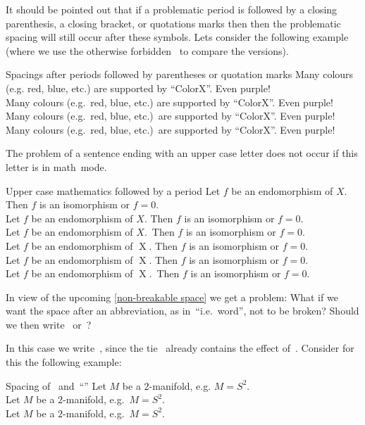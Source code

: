 It should be pointed out that if a problematic period is followed by a closing parenthesis, a closing bracket, or quotations marks then then the problematic spacing will still occur after these symbols.
Lets consider the following example (where we use the otherwise forbidden~\comname{\tbs} to compare the versions).
\begin{showlatex}{Spacings after periods followed by parentheses or quotation marks}
Many colours (e.g. red, blue, etc.) are supported by \enquote{ColorX}. Even purple! \\
Many colours (e.g.\ red, blue, etc.) are supported by \enquote{ColorX}. Even purple! \\
Many colours (e.g.\ red, blue, etc.)\ are supported by \enquote{ColorX}. Even purple! \\
Many colours (e.g.\ red, blue, etc.)\ are supported by \enquote{ColorX}\@. Even purple!
\end{showlatex}

The problem of a sentence ending with an upper case letter does not occur if this letter is in math~mode.
\begin{showlatex}{Upper case mathematics followed by a period}
Let $f$ be an endomorphism of $X$.
Then $f$ is an isomorphism or $f = 0$.\\
Let $f$ be an endomorphism of $X$\@.
Then $f$ is an isomorphism or $f = 0$.\\
Let $f$ be an endomorphism of $X$.\ 
Then $f$ is an isomorphism or $f = 0$.
\\
Let $f$ be an endomorphism of $\operatorname{X}$.
Then $f$ is an isomorphism or $f = 0$.\\
Let $f$ be an endomorphism of $\operatorname{X}$\@.
Then $f$ is an isomorphism or $f = 0$.\\
Let $f$ be an endomorphism of $\operatorname{X}$.\ 
Then $f$ is an isomorphism or $f = 0$.
\end{showlatex}

In view of the upcoming \cref{non-breakable space} we get a problem:
What if we want the space after an abbreviation, as in~\enquote{i.e.~word}, not to be broken?
Should we then write~\inlinecode{i.e.{\tbs} word} or~?

In this case we write~\inlinecode{i.e.{\customtexttilde}word}, since the tie~\inlinecode{\customtexttilde} already contains the effect of~.
Consider for this the following example:
\begin{showlatex}{Spacing of~\inlinecode{\customtexttilde} and~\enquote{\inlinecode{{\tbs} }}}
Let $M$ be a $2$-manifold, e.g. $M = S^2$. \\
Let $M$ be a $2$-manifold, e.g.\ $M = S^2$. \\
Let $M$ be a $2$-manifold, e.g.~$M = S^2$.
\end{showlatex}

